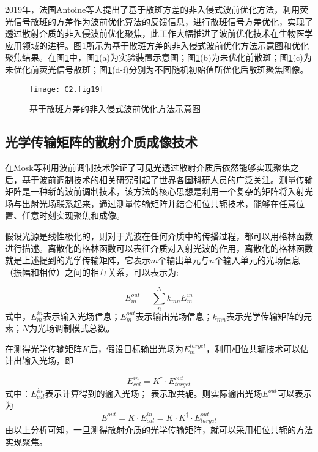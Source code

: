 2019年，法国Antoine等人\cite{boniface_non_invasive_2019}提出了基于散斑方差的非入侵式波前优化方法，利用荧光信号散斑的方差作为波前优化算法的反馈信息，进行散斑信号方差优化，实现了透过散射介质的非入侵波前优化聚焦，此工作大幅推进了波前优化技术在生物医学应用领域的进程。图\ref{fig2:19}所示为基于散斑方差的非入侵式波前优化方法示意图和优化聚焦结果。在图\ref{fig2:19}中，图\ref{fig2:19}(a)为实验装置示意图；图\ref{fig2:19}(b)为未优化前散斑；图\ref{fig2:19}(c)为未优化前荧光信号散斑；图\ref{fig2:19}(d-f)分别为不同随机初始值所优化后散斑聚焦图像。

\begin{figure}[htp]
	\centering
	\texttt{[image: C2.fig19]}
	\caption{基于散斑方差的非入侵式波前优化方法示意图\cite{boniface_non_invasive_2019}}
	\label{fig2:19}
\end{figure}


\subsection{光学传输矩阵的散射介质成像技术}

在Mosk等利用波前调制技术验证了可见光透过散射介质后依然能够实现聚焦之后，基于波前调制技术的相关研究引起了世界各国科研人员的广泛关注。测量传输矩阵是一种新的波前调制技术，该方法的核心思想是利用一个复杂的矩阵将入射光场与出射光场联系起来，通过测量传输矩阵并结合相位共轭技术，能够在任意位置、任意时刻实现聚焦和成像\cite{sheng_introduction_2007}。

假设光源是线性极化的，则对于光波在任何介质中的传播过程，都可以用格林函数进行描述。离散化的格林函数可以表征介质对入射光波的作用，离散化的格林函数就是上述提到的光学传输矩阵，它表示$m$个输出单元与$n$个输入单元的光场信息（振幅和相位）之间的相互关系，可以表示为:

\begin{equation}
    E_{m}^{out}=\sum_{n}^{N}k_{mn}E_{m}^{in}
\label{eq:2.1}
\end{equation}
式中，$E_{m}^{in}$表示输入光场信息；$E_{m}^{out}$表示输出光场信息；$k_{mn}$表示光学传输矩阵的元素；$N$为光场调制模式总数。

在测得光学传输矩阵$K$后，假设目标输出光场为$E_{m}^{target}$，利用相位共轭技术可以估计出输入光场，即

\begin{equation}
    E_{cal}^{in}=K^{\dag} \cdot E_{target}^{out}
\label{eq:2.2}
\end{equation}
式中：$E_{cal}^{in}$表示计算得到的输入光场；$^{\dag}$表示取共轭。则实际输出光场$E^{out}$可以表示为
\begin{equation}
  E^{out}=K \cdot E_{cal}^{in} =K \cdot K^{\dag} \cdot E_{target}^{out}
\label{eq:2.3}
\end{equation}
由以上分析可知，一旦测得散射介质的光学传输矩阵，就可以采用相位共轭的方法实现聚焦。

